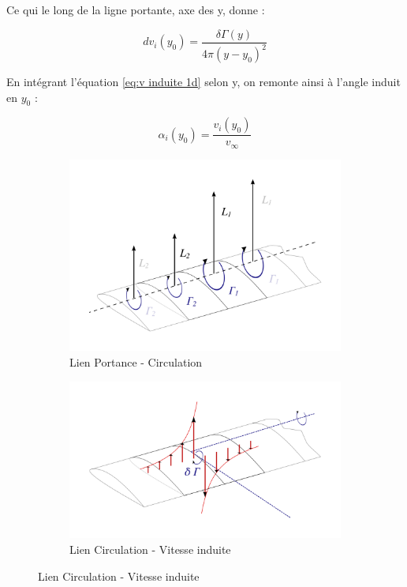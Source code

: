 Ce qui le long de la ligne portante, axe des y, donne : 

\begin{center}
    \begin{equation}
        dv_i(y_0) = \frac{\delta\Gamma(y)}{4\pi (y-y_0)^2}
        \label{eq:v induite 1d}
    \end{equation}
\end{center}

En intégrant l'équation \ref{eq:v induite 1d} selon y, on remonte ainsi à l'angle induit en $y_0$ : 
\begin{center}
    \begin{equation}
        \alpha_i(y_0) = \frac{v_i(y_0)}{v_{\infty}}
        \label{eq:angle induit}
    \end{equation}
\end{center}

\begin{figure}[H]
    \centering
    \begin{subfigure}[b]{0.45\textwidth}
        \centering
        \includegraphics[width=\textwidth]{Pics/01 - Basses Fidélités/LLT KJ.png}
        \caption{Lien Portance - Circulation}
        \label{fig:LLT KJ}
    \end{subfigure}
    \hfill
    \begin{subfigure}[b]{0.45\textwidth}
        \centering
        \includegraphics[width=\textwidth]{Pics/01 - Basses Fidélités/LLT vortex.png}
        \caption{Lien Circulation - Vitesse induite}
        \label{fig:LLT vortex}
    \end{subfigure}
\end{figure}

